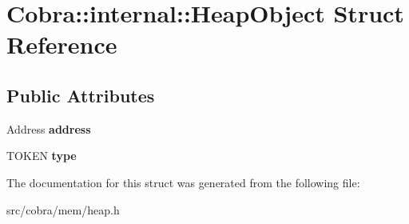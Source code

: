 \hypertarget{struct_cobra_1_1internal_1_1_heap_object}{\section{Cobra\+:\+:internal\+:\+:Heap\+Object Struct Reference}
\label{struct_cobra_1_1internal_1_1_heap_object}
}
\subsection*{Public Attributes}
\begin{DoxyCompactItemize}
\item 
\hypertarget{struct_cobra_1_1internal_1_1_heap_object_a7e738771f7dcbaabae86a8f18a843a3f}{Address {\bfseries address}}\label{struct_cobra_1_1internal_1_1_heap_object_a7e738771f7dcbaabae86a8f18a843a3f}

\item 
\hypertarget{struct_cobra_1_1internal_1_1_heap_object_abce58b1b7a4320de4700d2c0b9e1442a}{T\+O\+K\+E\+N {\bfseries type}}\label{struct_cobra_1_1internal_1_1_heap_object_abce58b1b7a4320de4700d2c0b9e1442a}

\end{DoxyCompactItemize}


The documentation for this struct was generated from the following file\+:\begin{DoxyCompactItemize}
\item 
src/cobra/mem/heap.\+h\end{DoxyCompactItemize}
